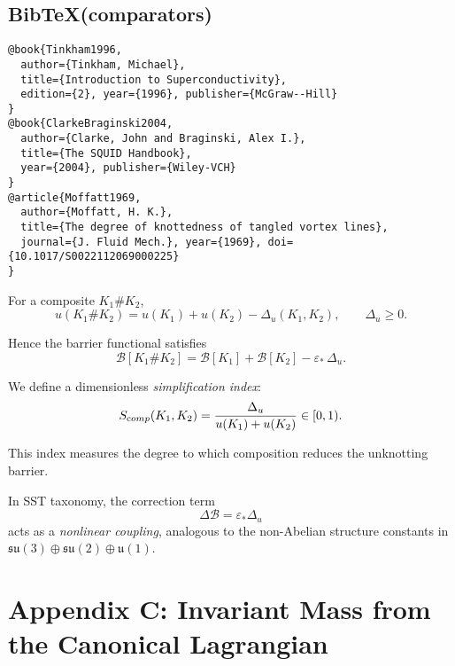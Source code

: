 \documentclass[11pt]{article}
\begin{document}
\subsection*{Bib\TeX (comparators)}
\begin{verbatim}
@book{Tinkham1996,
  author={Tinkham, Michael},
  title={Introduction to Superconductivity},
  edition={2}, year={1996}, publisher={McGraw--Hill}
}
@book{ClarkeBraginski2004,
  author={Clarke, John and Braginski, Alex I.},
  title={The SQUID Handbook},
  year={2004}, publisher={Wiley-VCH}
}
@article{Moffatt1969,
  author={Moffatt, H. K.},
  title={The degree of knottedness of tangled vortex lines},
  journal={J. Fluid Mech.}, year={1969}, doi={10.1017/S0022112069000225}
}
\end{verbatim}


For a composite $K_1 \# K_2$,
\[
    u(K_1 \# K_2)
    = u(K_1) + u(K_2) - \Delta_u(K_1,K_2),
    \qquad \Delta_u \ge 0.
\]

Hence the barrier functional satisfies
\[
    \mathcal B[K_1 \# K_2]
    = \mathcal B[K_1] + \mathcal B[K_2] - \varepsilon_*\,\Delta_u.
\]

We define a dimensionless \emph{simplification index}:
\[
    S_{\textrm comp}(K_1,K_2)
    = \frac{\Delta_u}{u(K_1)+u(K_2)} \in [0,1).
\]

This index measures the degree to which composition
reduces the unknotting barrier.

\medskip

In SST taxonomy, the correction term
\[
    \Delta\mathcal B = \varepsilon_* \Delta_u
\]
acts as a \emph{nonlinear coupling},
analogous to the non-Abelian structure constants
in $\mathfrak{su}(3)\oplus\mathfrak{su}(2)\oplus\mathfrak{u}(1)$.



\section*{Appendix C: Invariant Mass from the Canonical Lagrangian}
\end{document}
